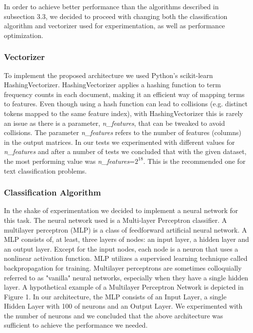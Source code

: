 In order to achieve better performance than the algorithms described in subsection 3.3, we decided to proceed with changing both the classification algorithm and vectorizer used for experimentation, as well as performance optimization.

\subsubsection{Vectorizer}
To implement the proposed architecture we used Python's scikit-learn HashingVectorizer. HashingVectorizer applies a hashing function to term frequency counts in each document, making it an efficient way of mapping terms to features. Even though using a hash function can lead to collisions (e.g. distinct tokens mapped to the same feature index), with HashingVectorizer this is rarely an issue as there is a parameter, \textit{n\_features}, that can be tweaked to avoid collisions. The parameter \textit{n\_features} refers to the number of features (columns) in the output matrices. In our tests we experimented with different values for \textit{n\_features} and after a number of tests we concluded that with the given dataset, the most performing value was \textit{n\_features}=$2^{18}$. This is the recommended one for text classification problems.

\subsubsection{Classification Algorithm}
In the shake of experimentation we decided to implement a neural network for this task. The neural network used is a Multi-layer Perceptron classifier. A multilayer perceptron (MLP)\cite{MLP} is a class of feedforward artificial neural network. A MLP consists of, at least, three layers of nodes: an input layer, a hidden layer and an output layer. Except for the input nodes, each node is a neuron that uses a nonlinear activation function. MLP utilizes a supervised learning technique called backpropagation for training. Multilayer perceptrons are sometimes colloquially referred to as "vanilla" neural networks, especially when they have a single hidden layer. A hypothetical example of a Multilayer Perceptron Network is depicted in Figure 1. In our architecture, the MLP consists of an Input Layer, a single Hidden Layer with 100 of neurons and an Output Layer. We experimented with the number of neurons and we concluded that the above architecture was sufficient to achieve the performance we needed.

